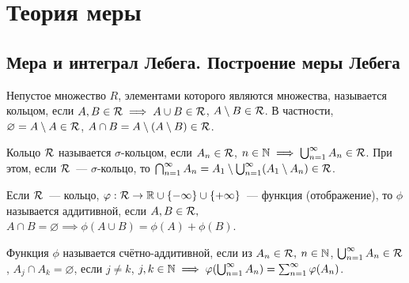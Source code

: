 \documentclass[main]{subfiles}
\begin{document}
\chapter{Теория меры}
\section{Мера и интеграл Лебега. Построение меры Лебега}
\begin{definition}
    Непустое множество $R$, элементами которого являются множества, называется кольцом, если $A, B \in \mathcal{R} \implies A \cup B \in \mathcal{R}$, $A \setminus B \in \mathcal{R}$.
    В частности, $\varnothing = A \setminus A \in \mathcal{R}$, $A \cap B = A \setminus (A \setminus B) \in \mathcal{R}$.
\end{definition}

\begin{definition}
    Кольцо $\mathcal{R}$ называется $\sigma$-кольцом, если $A_n \in \mathcal{R}$, $n \in \mathbb{N} \implies \bigcup_{n=1}^{\infty} A_n \in \mathcal{R}$.
    При этом, если $\mathcal{R}$~--- $\sigma$-кольцо, то $\bigcap_{n=1}^{\infty} A_n = A_1 \setminus \bigcup_{n=1}^{\infty} (A_1\setminus A_n) \in \mathcal{R}$.
\end{definition}

\begin{definition}
    Если $\mathcal{R}$~--- кольцо, $\varphi: \mathcal{R} \to \mathbb{R} \cup \{-\infty\} \cup \{+\infty\}$~--- функция (отображение), то $\phi$ называется аддитивной, если $A, B\in \mathcal{R},$ $A \cap B = \varnothing \implies \phi(A \cup B) = \phi(A) + \phi(B)$.
\end{definition}

\begin{definition}
    Функция $\phi$ называется счётно-аддитивной, если из $A_n \in \mathcal{R},$ $n \in \mathbb{N}$, $\bigcup_{n=1}^{\infty} A_n \in \mathcal{R}$, $A_j \cap A_k = \varnothing$, если $j \neq k$, $j, k \in \mathbb{N} \implies \varphi(\bigcup_{n=1}^{\infty} A_n) = \sum_{n=1}^{\infty} \varphi(A_n)$.
\end{definition}
\end{document}
